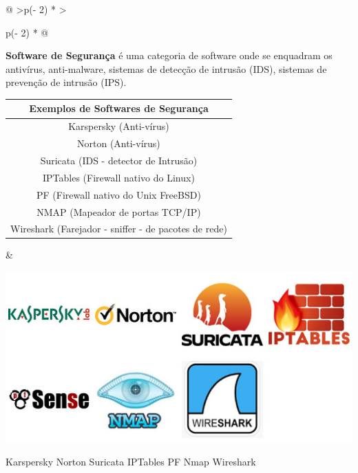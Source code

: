 \documentclass[
]{book}
\begin{document}
\begin{longtable}[]{@{}
  >{\centering\arraybackslash}p{(\columnwidth - 2\tabcolsep) * }
  >{\raggedright\arraybackslash}p{(\columnwidth - 2\tabcolsep) * }@{}}
\toprule\noalign{}
\endhead
\bottomrule\noalign{}
\endlastfoot
\begin{minipage}[t]{\linewidth}\centering
\textbf{Software de Segurança} é uma categoria de software onde se enquadram os antivírus, anti-malware, sistemas de detecção de intrusão (IDS), sistemas de prevenção de intrusão (IPS).

\begin{longtable}[]{@{}c@{}}
\toprule\noalign{}
Exemplos de Softwares de Segurança \\
\midrule\noalign{}
\endhead
\bottomrule\noalign{}
\endlastfoot
Karspersky (Anti-vírus) \\
Norton (Anti-vírus) \\
Suricata (IDS - detector de Intrusão) \\
IPTables (Firewall nativo do Linux) \\
PF (Firewall nativo do Unix FreeBSD) \\
NMAP (Mapeador de portas TCP/IP) \\
Wireshark (Farejador - sniffer - de pacotes de rede) \\
\end{longtable}
\end{minipage} & \begin{minipage}[t]{\linewidth}\raggedright
\begin{center}
\includegraphics{images/InfraEstrutura/software/seguranca.jpg}

Karspersky Norton Suricata IPTables PF Nmap Wireshark
\end{center}
\end{minipage} \\
\end{longtable}
\end{document}
